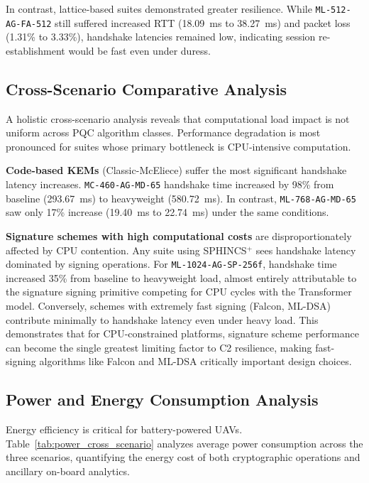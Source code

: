 \documentclass[sigconf,natbib=false]{acmart}
\begin{document}
In contrast, lattice-based suites demonstrated greater resilience. While \texttt{ML-512-AG-FA-512} still suffered increased RTT (18.09~ms to 38.27~ms) and packet loss (1.31\% to 3.33\%), handshake latencies remained low, indicating session re-establishment would be fast even under duress.

\subsection{Cross-Scenario Comparative Analysis}

A holistic cross-scenario analysis reveals that computational load impact is not uniform across PQC algorithm classes. Performance degradation is most pronounced for suites whose primary bottleneck is CPU-intensive computation.

\textbf{Code-based KEMs} (Classic-McEliece) suffer the most significant handshake latency increases. \texttt{MC-460-AG-MD-65} handshake time increased by 98\% from baseline (293.67~ms) to heavyweight (580.72~ms). In contrast, \texttt{ML-768-AG-MD-65} saw only 17\% increase (19.40~ms to 22.74~ms) under the same conditions.

\textbf{Signature schemes with high computational costs} are disproportionately affected by CPU contention. Any suite using SPHINCS$^+$ sees handshake latency dominated by signing operations. For \texttt{ML-1024-AG-SP-256f}, handshake time increased 35\% from baseline to heavyweight load, almost entirely attributable to the signature signing primitive competing for CPU cycles with the Transformer model. Conversely, schemes with extremely fast signing (Falcon, ML-DSA) contribute minimally to handshake latency even under heavy load. This demonstrates that for CPU-constrained platforms, signature scheme performance can become the single greatest limiting factor to C2 resilience, making fast-signing algorithms like Falcon and ML-DSA critically important design choices.

\subsection{Power and Energy Consumption Analysis}

Energy efficiency is critical for battery-powered UAVs. Table~\ref{tab:power_cross_scenario} analyzes average power consumption across the three scenarios, quantifying the energy cost of both cryptographic operations and ancillary on-board analytics.
\end{document}
